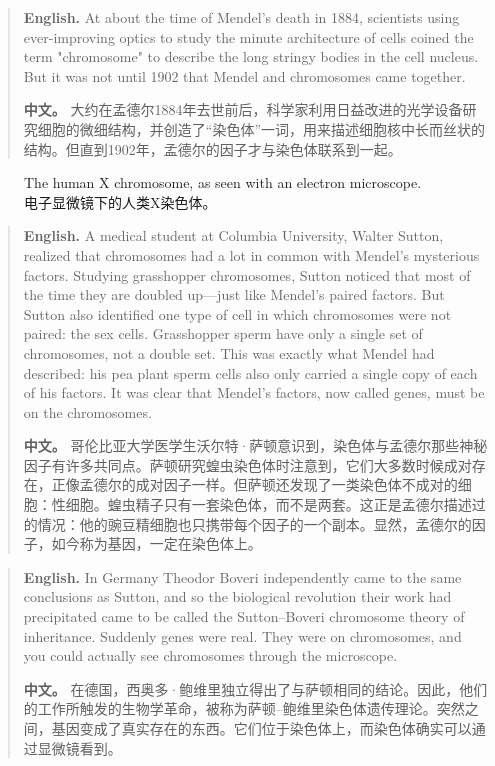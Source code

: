 \begin{quote}
\noindent\textbf{English.} At about the time of Mendel's death in 1884, scientists using ever-improving optics to study the minute architecture of cells coined the term "chromosome" to describe the long stringy bodies in the cell nucleus. But it was not until 1902 that Mendel and chromosomes came together.

\smallskip
\noindent\textbf{中文。} 大约在孟德尔1884年去世前后，科学家利用日益改进的光学设备研究细胞的微细结构，并创造了“染色体”一词，用来描述细胞核中长而丝状的结构。但直到1902年，孟德尔的因子才与染色体联系到一起。
\end{quote}

\begin{figure}[htbp]
\centering
{}
\caption{The human X chromosome, as seen with an electron microscope.\\电子显微镜下的人类X染色体。}
\end{figure}

\begin{quote}
\noindent\textbf{English.} A medical student at Columbia University, Walter Sutton, realized that chromosomes had a lot in common with Mendel's mysterious factors. Studying grasshopper chromosomes, Sutton noticed that most of the time they are doubled up---just like Mendel's paired factors. But Sutton also identified one type of cell in which chromosomes were not paired: the sex cells. Grasshopper sperm have only a single set of chromosomes, not a double set. This was exactly what Mendel had described: his pea plant sperm cells also only carried a single copy of each of his factors. It was clear that Mendel's factors, now called genes, must be on the chromosomes.

\smallskip
\noindent\textbf{中文。} 哥伦比亚大学医学生沃尔特·萨顿意识到，染色体与孟德尔那些神秘因子有许多共同点。萨顿研究蝗虫染色体时注意到，它们大多数时候成对存在，正像孟德尔的成对因子一样。但萨顿还发现了一类染色体不成对的细胞：性细胞。蝗虫精子只有一套染色体，而不是两套。这正是孟德尔描述过的情况：他的豌豆精细胞也只携带每个因子的一个副本。显然，孟德尔的因子，如今称为基因，一定在染色体上。
\end{quote}

\begin{quote}
\noindent\textbf{English.} In Germany Theodor Boveri independently came to the same conclusions as Sutton, and so the biological revolution their work had precipitated came to be called the Sutton--Boveri chromosome theory of inheritance. Suddenly genes were real. They were on chromosomes, and you could actually see chromosomes through the microscope.

\smallskip
\noindent\textbf{中文。} 在德国，西奥多·鲍维里独立得出了与萨顿相同的结论。因此，他们的工作所触发的生物学革命，被称为萨顿--鲍维里染色体遗传理论。突然之间，基因变成了真实存在的东西。它们位于染色体上，而染色体确实可以通过显微镜看到。
\end{quote}

